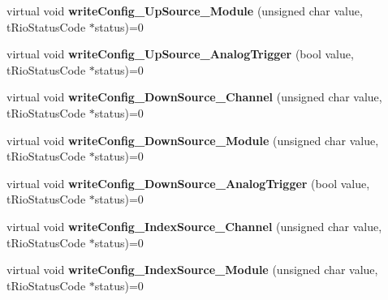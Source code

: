 \begin{DoxyCompactItemize}
\item 
\hypertarget{classnFPGA_1_1nFRC__2012__1__6__4_1_1tCounter_a3dd26bd7ab48f570d9443bb4198bf02d}{
virtual void {\bfseries writeConfig\_\-UpSource\_\-Module} (unsigned char value, tRioStatusCode $\ast$status)=0}
\label{classnFPGA_1_1nFRC__2012__1__6__4_1_1tCounter_a3dd26bd7ab48f570d9443bb4198bf02d}

\item 
\hypertarget{classnFPGA_1_1nFRC__2012__1__6__4_1_1tCounter_a3326635dd597eeb8c2d2c0c2ea53e4c1}{
virtual void {\bfseries writeConfig\_\-UpSource\_\-AnalogTrigger} (bool value, tRioStatusCode $\ast$status)=0}
\label{classnFPGA_1_1nFRC__2012__1__6__4_1_1tCounter_a3326635dd597eeb8c2d2c0c2ea53e4c1}

\item 
\hypertarget{classnFPGA_1_1nFRC__2012__1__6__4_1_1tCounter_a58c69d36903a65822b65f2aec3d075a0}{
virtual void {\bfseries writeConfig\_\-DownSource\_\-Channel} (unsigned char value, tRioStatusCode $\ast$status)=0}
\label{classnFPGA_1_1nFRC__2012__1__6__4_1_1tCounter_a58c69d36903a65822b65f2aec3d075a0}

\item 
\hypertarget{classnFPGA_1_1nFRC__2012__1__6__4_1_1tCounter_afad9d348f6477a2f6411311620d3b5be}{
virtual void {\bfseries writeConfig\_\-DownSource\_\-Module} (unsigned char value, tRioStatusCode $\ast$status)=0}
\label{classnFPGA_1_1nFRC__2012__1__6__4_1_1tCounter_afad9d348f6477a2f6411311620d3b5be}

\item 
\hypertarget{classnFPGA_1_1nFRC__2012__1__6__4_1_1tCounter_ac17d9ca308a551113e43649078450ea4}{
virtual void {\bfseries writeConfig\_\-DownSource\_\-AnalogTrigger} (bool value, tRioStatusCode $\ast$status)=0}
\label{classnFPGA_1_1nFRC__2012__1__6__4_1_1tCounter_ac17d9ca308a551113e43649078450ea4}

\item 
\hypertarget{classnFPGA_1_1nFRC__2012__1__6__4_1_1tCounter_ab7ec3a095e5033ad48dab587c8df2f32}{
virtual void {\bfseries writeConfig\_\-IndexSource\_\-Channel} (unsigned char value, tRioStatusCode $\ast$status)=0}
\label{classnFPGA_1_1nFRC__2012__1__6__4_1_1tCounter_ab7ec3a095e5033ad48dab587c8df2f32}

\item 
\hypertarget{classnFPGA_1_1nFRC__2012__1__6__4_1_1tCounter_a2c4a94a927bb0475b94504731ecb57d4}{
virtual void {\bfseries writeConfig\_\-IndexSource\_\-Module} (unsigned char value, tRioStatusCode $\ast$status)=0}
\label{classnFPGA_1_1nFRC__2012__1__6__4_1_1tCounter_a2c4a94a927bb0475b94504731ecb57d4}


\end{DoxyCompactItemize}
